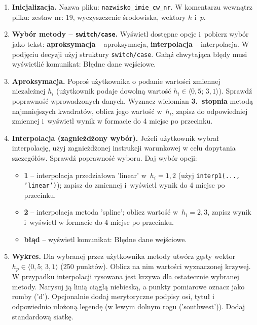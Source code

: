 \documentclass[a4paper,11pt]{article}
\begin{document}
\begin{enumerate}[leftmargin=*, label=\textbf{\arabic*.}, itemsep=2pt]

  \item \textbf{Inicjalizacja.}
    Nazwa pliku: \texttt{nazwisko\_imie\_cw\_nr}. W komentarzu wewnątrz pliku: zestaw nr: 19, wyczyszczenie środowiska, wektory $h$ i~$p$.

  \item \textbf{Wybór metody -- \texttt{switch/case}.}
    Wyświetl dostępne opcje i~pobierz wybór jako tekst: \textbf{aproksymacja} -- aproksymacja, \textbf{interpolacja} -- interpolacja. W podjęciu decyzji użyj struktury \texttt{switch/case}. Gałąź chwytająca błędy musi wyświetlić komunikat: Błędne dane wejściowe.

  \item \textbf{Aproksymacja.}
    Poproś użytkownika o podanie wartości zmiennej niezależnej $h_i$ (użytkownik podaje dowolną wartość $h_i \in \langle 0{,}5;\,3{,}1 \rangle$). Sprawdź poprawność wprowadzonych danych. Wyznacz wielomian \textbf{3.~stopnia} metodą najmniejszych kwadratów, oblicz jego wartość w~$h_i$, zapisz do odpowiedniej zmiennej i~wyświetl wynik w formacie do 4 miejsc po przecinku.

  \item \textbf{Interpolacja (zagnieżdżony wybór).}
    Jeżeli użytkownik wybrał interpolację, użyj zagnieżdżonej instrukcji warunkowej w celu dopytania szczegółów. Sprawdź poprawność wyboru. Daj wybór opcji:
    \begin{itemize}[itemsep=1pt]
      \item \textbf{1} -- interpolacja przedziałowa 'linear' w~$h_i = 1{,}2$ (użyj \texttt{interp1(..., 'linear')}); zapisz do zmiennej i~wyświetl wynik do 4 miejsc po przecinku.
      \item \textbf{2} -- interpolacja metoda 'spline'; oblicz wartość w~$h_i = 2{,}3$, zapisz wynik i~wyświetl w formacie do 4 miejsc po przecinku.
      \item \textbf{błąd} -- wyświetl komunikat: Błędne dane wejściowe.
    \end{itemize}

  \item \textbf{Wykres.}
    Dla wybranej przez użytkownika metody utwórz gęsty wektor $h_p \in \langle 0{,}5;\,3{,}1 \rangle$ (250 punktów). Oblicz na nim wartości wyznaczonej krzywej. W przypadku interpolacji rysowana jest krzywa dla ostatecznie wybranej metody. Narysuj ją linią ciągłą niebieską, a punkty pomiarowe oznacz jako romby ('d'). Opcjonalnie dodaj merytoryczne podpisy osi, tytuł i odpowiednio ułożoną legendę (w lewym dolnym rogu ('southwest')). Dodaj standardową siatkę.

\end{enumerate}
\end{document}

